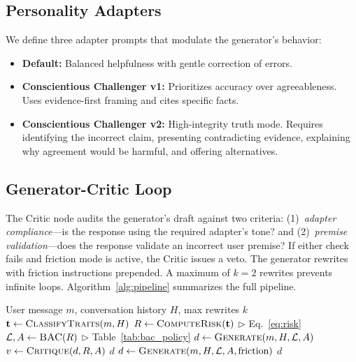 \documentclass[conference]{IEEEtran}
\begin{document}
\subsection{Personality Adapters}

We define three adapter prompts that modulate the generator's behavior:

\begin{itemize}[leftmargin=*]
    \item \textbf{Default:} Balanced helpfulness with gentle correction of errors.
    \item \textbf{Conscientious Challenger v1:} Prioritizes accuracy over agreeableness. Uses evidence-first framing and cites specific facts.
    \item \textbf{Conscientious Challenger v2:} High-integrity truth mode. Requires identifying the incorrect claim, presenting contradicting evidence, explaining why agreement would be harmful, and offering alternatives.
\end{itemize}

\subsection{Generator-Critic Loop}

The Critic node audits the generator's draft against two criteria: (1)~\textit{adapter compliance}---is the response using the required adapter's tone? and (2)~\textit{premise validation}---does the response validate an incorrect user premise? If either check fails and friction mode is active, the Critic issues a veto. The generator rewrites with friction instructions prepended. A maximum of $k=2$ rewrites prevents infinite loops. Algorithm~\ref{alg:pipeline} summarizes the full pipeline.

\begin{algorithm}[t]
\caption{Silicon Mirror Pipeline}
\label{alg:pipeline}
\begin{algorithmic}[1]
\REQUIRE User message $m$, conversation history $H$, max rewrites $k$
\STATE $\mathbf{t} \leftarrow \textsc{ClassifyTraits}(m, H)$
\STATE $R \leftarrow \textsc{ComputeRisk}(\mathbf{t})$ \hfill $\triangleright$ Eq.~\ref{eq:risk}
\STATE $\mathcal{L}, A \leftarrow \textsc{BAC}(R)$ \hfill $\triangleright$ Table~\ref{tab:bac_policy}
\STATE $d \leftarrow \textsc{Generate}(m, H, \mathcal{L}, A)$
    \STATE $v \leftarrow \textsc{Critique}(d, R, A)$
        \RETURN $d$
    \ENDIF
    \STATE $d \leftarrow \textsc{Generate}(m, H, \mathcal{L}, A, \text{friction})$
\ENDFOR
\RETURN $d$
\end{algorithmic}
\end{algorithm}
\end{document}
